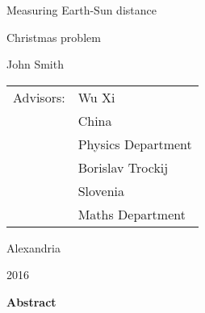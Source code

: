 \pagestyle{empty}

\vspace*{2cm}


\begin{center}
{\huge Measuring Earth-Sun distance}
\par\end{center}{\LARGE \par}

\begin{center}
\Huge Christmas problem
\par\end{center}{\huge \par}

\vspace{1.0cm}

\vspace{1.0cm}
\begin{center}
{\Large John Smith}
\par\end{center}{\huge \par}
\vspace{2.0cm}

\begin{center}
{\large }
\begin{tabular}{ll}
{\Large Advisors:} & {\Large Wu Xi}\tabularnewline
 & {\Large China}\tabularnewline
\vspace{0.5cm}
 & {\Large Physics Department }\tabularnewline
 & {\Large Borislav Trockij} \tabularnewline
 & {\Large Slovenia} \tabularnewline
 & {\Large Maths Department}\tabularnewline
\end{tabular}
\end{center}

\vspace*{1.0cm}


\vspace{1.0cm}

\begin{center}
Alexandria
\par\end{center}
\begin{center}
2016
\par
\end{center}

\newpage


\begin{center}
\Large
\textbf{Abstract}
\end{center}
 
\vspace{0.8cm}

\small

\blindtext

\newpage

